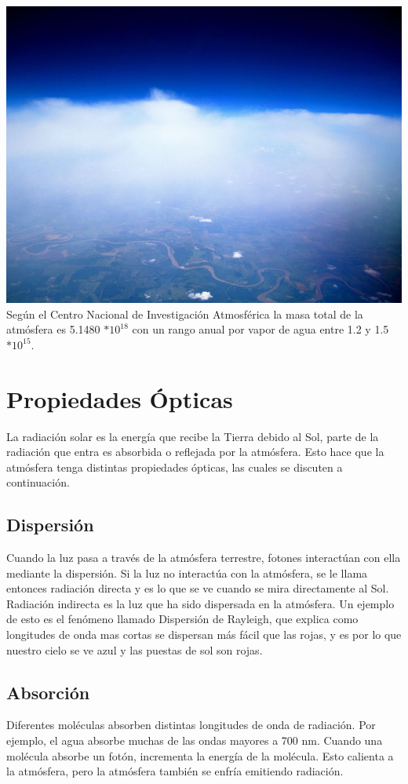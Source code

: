 \documentclass{article} %
\begin{document}
\begin{center}
\includegraphics[scale=0.3]{atm3.jpg}
\\Según el Centro Nacional de Investigación Atmosférica la masa total de la atmósfera es 5.1480 $* 10^{18}$ con un rango anual por vapor de agua entre 1.2 y 1.5 $* 10 ^{15}$.
\end{center}

\section{Propiedades Ópticas}
La radiación solar es la energía que recibe la Tierra debido al Sol, parte de la radiación que entra es absorbida o reflejada por la atmósfera. Esto hace que la atmósfera tenga distintas propiedades ópticas, las cuales se discuten a continuación.

\subsection{Dispersión}
Cuando la luz pasa a través de la atmósfera terrestre, fotones interactúan con ella mediante la dispersión. Si la luz no interactúa con la atmósfera, se le llama entonces radiación directa y es lo que se ve cuando se mira directamente al Sol. Radiación indirecta es la luz que ha sido dispersada en la atmósfera. Un ejemplo de esto es el fenómeno llamado Dispersión de Rayleigh, que explica como longitudes de onda mas cortas se dispersan más fácil que las rojas, y es por lo que nuestro cielo se ve azul y las puestas de sol son rojas.

\subsection{Absorción}
Diferentes moléculas absorben distintas longitudes de onda de radiación. Por ejemplo, el agua absorbe muchas de las ondas mayores a 700 nm. Cuando una molécula absorbe un fotón, incrementa la energía de la molécula. Esto calienta a la atmósfera, pero la atmósfera también se enfría emitiendo radiación.\\
\end{document}
